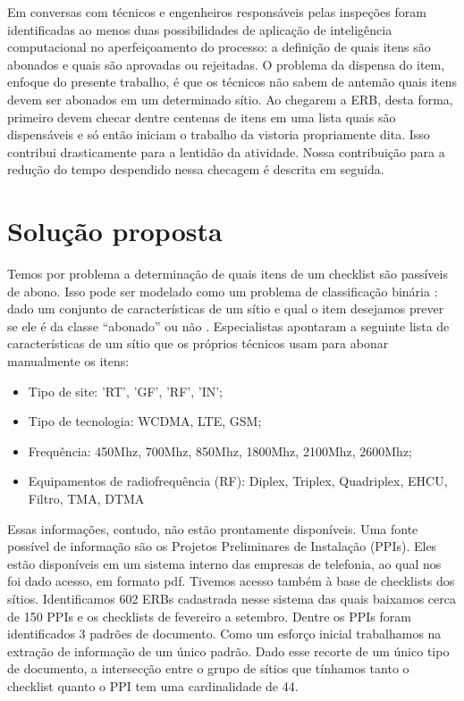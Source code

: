 \documentclass[
	12pt,				%
	openany,			%
	oneside,			%
	a4paper,			%
	english,			%
	french,				%
	spanish,			%
	brazil,				%
	]{abntex2}
\begin{document}
Em conversas com técnicos e engenheiros responsáveis pelas inspeções foram
identificadas ao menos duas possibilidades de aplicação de inteligência
computacional no aperfeiçoamento do processo: a definição de quais itens são
abonados e quais são aprovadas ou rejeitadas. O problema da dispensa do item,
enfoque do presente trabalho, é que os técnicos não sabem de antemão quais itens
devem ser abonados em um determinado sítio. Ao chegarem a ERB, desta forma,
primeiro devem checar dentre centenas de itens em uma lista quais são
dispensáveis e só então iniciam o trabalho da vistoria propriamente dita. Isso
contribui drasticamente para a lentidão da atividade. Nossa contribuição para a
redução do tempo despendido nessa checagem é descrita em seguida.

\chapter[Solução proposta]{Solução proposta}
Temos por problema a determinação de quais itens de um checklist são passíveis
de abono. Isso pode ser modelado como um problema de classificação binária :
dado um conjunto de características de um sítio e qual o item desejamos prever
se ele é da classe ``abonado'' ou não \cite{james2013introduction}.
Especialistas apontaram a seguinte lista de características de um sítio que os
próprios técnicos usam para abonar manualmente os itens:

\begin{itemize}
\item Tipo de site: 'RT', 'GF', 'RF', 'IN'; 
\item Tipo de tecnologia: WCDMA, LTE, GSM;
\item Frequência: 450Mhz, 700Mhz, 850Mhz, 1800Mhz,  2100Mhz, 2600Mhz;
\item Equipamentos de radiofrequência (RF): Diplex, Triplex, Quadriplex, EHCU, Filtro, TMA, DTMA
\end{itemize}

Essas informações, contudo, não estão prontamente disponíveis. Uma fonte
possível de informação são os Projetos Preliminares de Instalação (PPIs). Eles
estão disponíveis em um sistema interno das empresas de telefonia, ao qual nos
foi dado acesso, em formato pdf. Tivemos acesso também à base de checklists dos
sítios. Identificamos 602 ERBs cadastrada nesse sistema das quais baixamos cerca
de 150 PPIs e os checklists de fevereiro a setembro. Dentre os PPIs foram
identificados 3 padrões de documento. Como um esforço inicial trabalhamos na
extração de informação de um único padrão. Dado esse recorte de um único tipo de
documento, a intersecção entre o grupo de sítios que tínhamos tanto o checklist
quanto o PPI tem uma cardinalidade de 44.
\end{document}
